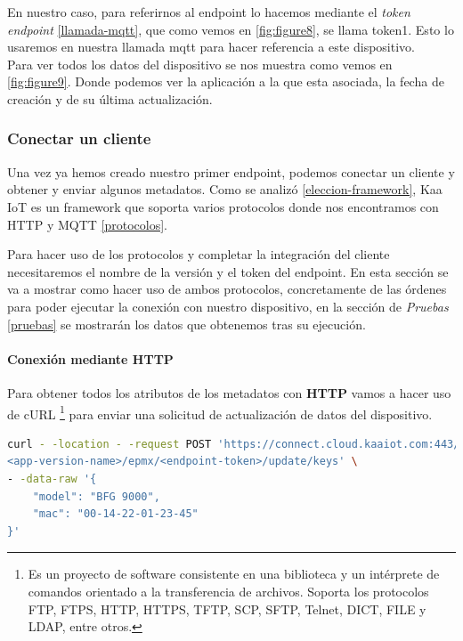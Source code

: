 {En nuestro caso, para referirnos al endpoint lo hacemos mediante el \textit{token endpoint} \ref{llamada-mqtt}, que como vemos en \ref{fig:figure8}, se llama token1. Esto lo usaremos en nuestra llamada mqtt para hacer referencia a este dispositivo.\\

Para ver todos los datos del dispositivo se nos muestra como vemos en \ref{fig:figure9}. Donde podemos ver la aplicación a la que esta asociada, la fecha de creación y de su última actualización.

\newpage

\subsubsection{Conectar un cliente}

Una vez ya hemos creado nuestro primer endpoint, podemos conectar un cliente y obtener y enviar algunos metadatos. Como se analizó \ref{eleccion-framework}, Kaa IoT es un framework que soporta varios protocolos donde nos encontramos con HTTP y MQTT \ref{protocolos}.

Para hacer uso de los protocolos y completar la integración del cliente necesitaremos el nombre de la versión y el token del endpoint. En esta sección se va a mostrar como hacer uso de ambos protocolos, concretamente de las órdenes para poder ejecutar la conexión con nuestro dispositivo, en la sección de \textit{Pruebas} \ref{pruebas} se mostrarán los datos que obtenemos tras su ejecución.\\

\paragraph{Conexión mediante HTTP}

Para obtener todos los atributos de los metadatos con \textbf{HTTP} vamos a hacer uso de cURL \footnote{Es un proyecto de software consistente en una biblioteca y un intérprete de comandos orientado a la transferencia de archivos. Soporta los protocolos FTP, FTPS, HTTP, HTTPS, TFTP, SCP, SFTP, Telnet, DICT, FILE y LDAP, entre otros.} para enviar una solicitud de actualización de datos del dispositivo.

\begin{lstlisting}[language=bash]
curl - -location - -request POST 'https://connect.cloud.kaaiot.com:443/kp1/
<app-version-name>/epmx/<endpoint-token>/update/keys' \
- -data-raw '{
    "model": "BFG 9000",
    "mac": "00-14-22-01-23-45"
}'
\end{lstlisting}

}
